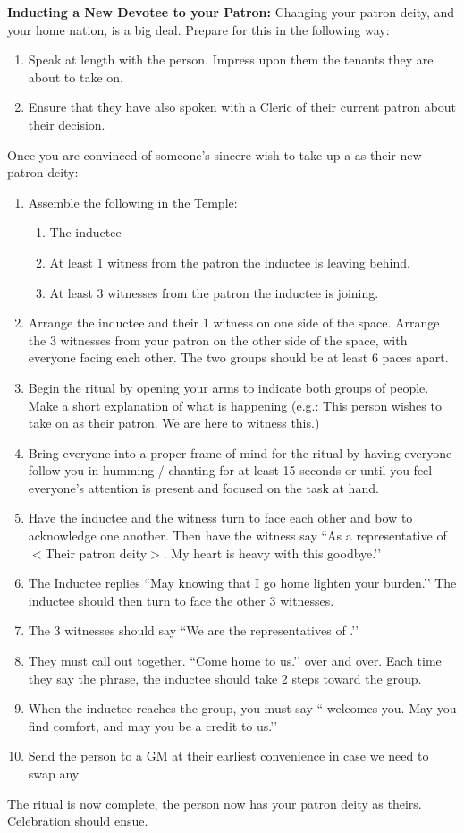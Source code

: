 \documentclass[green]{GL2020}
\begin{document}
\textbf{Inducting a New Devotee to your Patron:}
Changing your patron deity, and your home nation, is a big deal. Prepare for this in the following way:
  \begin{enumerate}
    \item Speak at length with the person. Impress upon them the tenants they are about to take on.
    \item Ensure that they have also spoken with a Cleric of their current patron about their decision.
  \end{enumerate}
  
Once you are convinced of someone’s sincere wish to take up a \cFarmGod{} as their new patron deity:
  \begin{enumerate}
    \item Assemble the following in the Temple:
    \begin{enumerate}
      \item The inductee
      \item At least 1 witness from the patron the inductee is leaving behind.
      \item At least 3 witnesses from the patron the inductee is joining.
    \end{enumerate}
    \item Arrange the inductee and their 1 witness on one side of the space. Arrange the 3 witnesses from your patron on the other side of the space, with everyone facing each other. The two groups should be at least 6 paces apart.
    \item Begin the ritual by opening your arms to indicate both groups of people. Make a short explanation of what is happening (e.g.: This person wishes to take on \cFarmGod{} as their patron. We are here to witness this.)
    \item Bring everyone into a proper frame of mind for the ritual by having everyone follow you in humming / chanting for at least 15 seconds or until you feel everyone’s attention is present and focused on the task at hand.
    \item Have the inductee and the witness turn to face each other and bow to acknowledge one another. Then have the witness say ``As a representative of $<$Their patron deity$>$. My heart is heavy with this goodbye.’’
    \item The Inductee replies ``May knowing that I go home lighten your burden.’’ The inductee should then turn to face the other 3 witnesses.
    \item The 3 witnesses should say ``We are the representatives of \cFarmGod{}.’’
    \item They must call out together. ``Come home to us.’’ over and over. Each time they say the phrase, the inductee should take 2 steps toward the group.
    \item When the inductee reaches the group, you must say ``\cFarmGod{} welcomes you. May you find comfort, and may you be a credit to us.’’
    \item Send the person to a GM at their earliest convenience in case we need to swap any
  \end{enumerate}
The ritual is now complete, the person now has your patron deity as theirs. Celebration should ensue.
   
\end{document}
